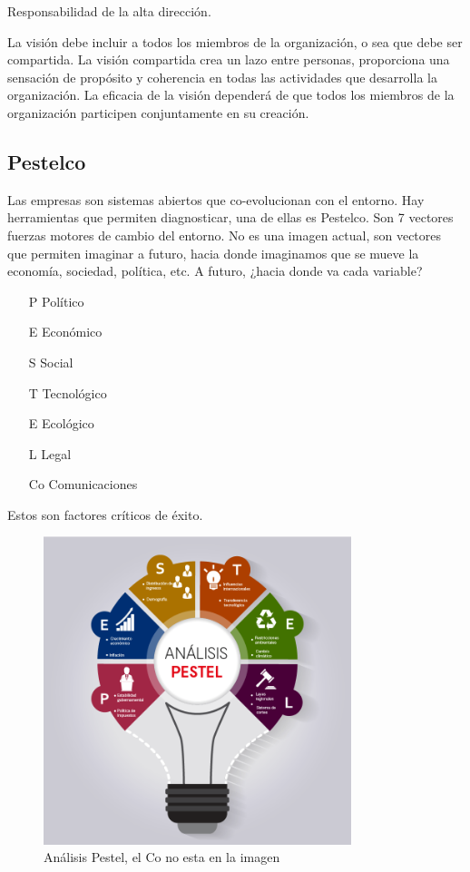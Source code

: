 \documentclass[titlepage,a4paper]{article}
\begin{document}
Responsabilidad de la alta dirección.

La visión debe incluir a todos los miembros de la organización, o sea que debe ser compartida. La visión compartida crea un lazo entre personas, proporciona una sensación de propósito y coherencia en todas las actividades que desarrolla la organización. La eficacia de la visión dependerá de que todos los miembros de la organización participen conjuntamente en su creación. 

\newpage

\subsection{Pestelco}
Las empresas son sistemas abiertos que co-evolucionan con el entorno. Hay herramientas que permiten diagnosticar, una de ellas es Pestelco. Son 7 vectores fuerzas motores de cambio del entorno. No es una imagen actual, son vectores que permiten imaginar a futuro, hacia donde imaginamos que se mueve la economía, sociedad, política, etc. A futuro, ¿hacia donde va cada variable?

\begin{itemize}
    \item[P] Político
    \item[E] Económico
    \item[S] Social
    \item[T] Tecnológico
    \item[E] Ecológico
    \item[L] Legal
    \item[Co] Comunicaciones
\end{itemize}

Estos son factores críticos de éxito.

\begin{figure}[!htb]
    \centering
    \includegraphics[width=0.8\textwidth]{imagenes/PestelAnalisis.png}
    \caption{Análisis Pestel, el Co no esta en la imagen}
\end{figure}
\end{document}
